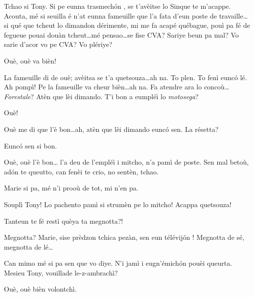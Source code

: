 \begin{drama}

\Turispeaks{} Tchao si Tony. Si pe eunna trasmech\'on , se t'avèitse lo Sinque te m'acappe. Acouta, mé si seuilla é n'at eunna fameuille que l'a fata d'eun poste de travaille\ldots si qué que tcheut lo dimandon dérimente, mi me fa acapé québague, pouì pa fé de fegueue pouai douàn tcheut\ldots mé pensao\ldots se fise CVA? Sariye beun pa mal?  Vo sarie d'acor vo pe CVA? Vo plériye?


\Tanteunspeaks Ouè, ouè va bièn!

\Turispeaks{} La fameuille di de ouè; avèitsa se t'a quetsouza\ldots ah na. To plen. To fenì eunc\'o lé. Ah pompì! Pe la fameuille va cheur bièn\ldots ah na. Fa atendre ara lo concoù\ldots \textit{Forestale}? Atèn que lèi dimando.  T'i bon a eumpléì lo \textit{motosega}?

\Twitterspeaks{} Ouè!

\Turispeaks{} Ouè me di que l'è bon\ldots ah, atèn que lèi dimando eunc\'o sen.  La résetta?

\Twitterspeaks{} Eunc\'o sen si bon.

\Turispeaks{} Ouè, ouè l'è bon\ldots {} l'a deu de l'empléì i mitcho, n'a pamì de poste.  Sen mal betoù, ad\'on te queutto, can fenèi te crio, no sentèn, tchao.


\Turispeaks Marie si pa, mé n'i prooù de tot, mi n'en pa.

\Ipadspeaks Souplì Tony! Lo pachento pamì si strumèn pe lo mitcho! Acappa quetsouza!

\Alicespeaks{} Tanteun te fé restì quèya ta megnotta?!

\Turispeaks Megnotta? Marie, sise prèdzon tchica pezàn, sen eun télévij\'on ! Megnotta de sé, megnotta de lé\ldots


\Mariespeaks Can mimo mé si pa sen que vo diye. N'i jamì i eugn'émich\'on pouèi queurta. Mesieu Tony, vouillade le-z-am\-bra\-chì?

\Turispeaks Ouè, ouè bièn volontchì.


\end{drama}
